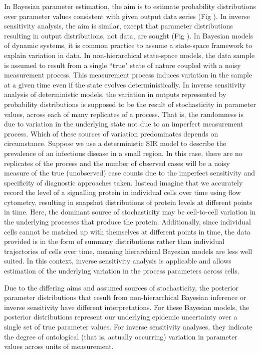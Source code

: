 \documentclass[10pt,letterpaper]{article}
\begin{document}
In Bayesian parameter estimation, the aim is to estimate probability distributions over parameter values consistent with given output data series (Fig ). In inverse sensitivity analysis, the aim is similar, except that parameter distributions resulting in output distributions, not data, are sought (Fig ). In Bayesian models of dynamic systems, it is common practice to assume a state-space framework to explain variation in data. In non-hierarchical state-space models, the data sample is assumed to result from a single ``true" state of nature coupled with a noisy measurement process. This measurement process induces variation in the sample at a given time even if the state evolves deterministically. In inverse sensitivity analysis of deterministic models, the variation in outputs represented by probability distributions is supposed to be the result of stochasticity in parameter values, across each of many replicates of a process. That is, the randomness is due to variation in the underlying state not due to an imperfect measurement process. Which of these sources of variation predominates depends on circumstance. Suppose we use a deterministic SIR model to describe the prevalence of an infectious disease in a small region. In this case, there are no replicates of the process and the number of observed cases will be a noisy measure of the true (unobserved) case counts due to the imperfect sensitivity and specificity of diagnostic approaches taken. Instead imagine that we accurately record the level of a signalling protein in individual cells over time using flow cytometry, resulting in snapshot distributions of protein levels at different points in time. Here, the dominant source of stochasticity may be cell-to-cell variation in the underlying processes that produce the protein. Additionally, since individual cells cannot be matched up with themselves at different points in time, the data provided is in the form of summary distributions rather than individual trajectories of cells over time, meaning hierarchical Bayesian models are less well suited. In this context, inverse sensitivity analysis is applicable and allows estimation of the underlying variation in the process parameters across cells.

Due to the differing aims and assumed sources of stochasticity, the posterior parameter distributions that result from non-hierarchical Bayesian inference or inverse sensitivity have different interpretations. For these Bayesian models, the posterior distributions represent our underlying epidemic uncertainty over a single set of true parameter values. For inverse sensitivity analyses, they indicate the degree of ontological (that is, actually occurring) variation in parameter values across units of measurement.
\end{document}
